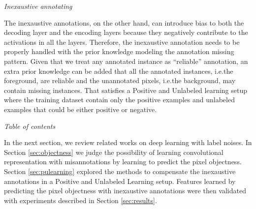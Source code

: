 \noindent
\textit{Inexaustive annotating}

\noindent
The inexaustive annotations, on the other hand, can introduce bias to both the decoding layer and the encoding layers because they negatively contribute to the activations in all the layers.
Therefore, the inexaustive annotation needs to be properly handled with the prior knowledge modeling the annotation missing pattern.
Given that we treat any annotated instance as ``reliable'' annotation, an extra prior knowledge can be added that all the annotated instances, i.e.the foreground, are reliable and the unannotated pixels, i.e.the background, may contain missing instances.
That satisfies a Positive and Unlabeled learning setup where the training dataset contain only the positive examples and unlabeled examples that could be either positive or negative.


\noindent
\textit{Table of contents}

\noindent
In the next section, we review related works on deep learning with label noises.
In Section \ref{sec:objectness} we judge the possibility of learning convolutional representation with misannotations by learning to predict the pixel objectness.
Section \ref{sec:pulearning} explored the methods to compensate the inexaustive annotations in a Positive and Unlabeled Learning setup.
Features learned by predicting the pixel objectness with inexaustive annotations were then validated with experiments described in Section \ref{sec:results}.

%
